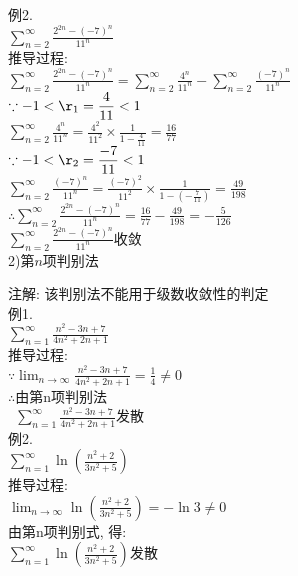 例2.\\
\phantom{例}$\displaystyle\sum_{n=2}^\infty\frac{2^{2n}-(-7)^n}{11^n}$\\
推导过程:\\
$\displaystyle\sum_{n=2}^\infty\frac{2^{2n}-(-7)^n}{11^n}=\sum_{n=2}^\infty\frac{4^n}{11^n}-\sum_{n=2}^\infty\frac{(-7)^n}{11^n}$\\
$\displaystyle\because -1<\r_1=\frac{4}{11}<1$\\
$\displaystyle\sum_{n=2}^\infty\frac{4^n}{11^n}=\frac{4^2}{11^2}\times\frac{1}{1-\frac{4}{11}}=\frac{16}{77}$\\
$\displaystyle\because -1<\r_2=\frac{-7}{11}<1$\\
$\displaystyle\sum_{n=2}^\infty\frac{(-7)^n}{11^n}=\frac{(-7)^2}{11^2}\times\frac{1}{1-(-\frac{7}{11})}=\frac{49}{198}$\\
$\displaystyle\therefore\sum_{n=2}^\infty\frac{2^{2n}-(-7)^n}{11^n}=\frac{16}{77}-\frac{49}{198}=-\frac{5}{126}$\\
$\displaystyle\sum_{n=2}^\infty\frac{2^{2n}-(-7)^n}{11^n}$收敛\\[2ex]

2)第$n$项判别法
\begin{center}
\end{center}
注解: 该判别法不能用于级数收敛性的判定\\
例1.\\
\phantom{例}$\displaystyle\sum_{n=1}^{\infty}\frac{n^2-3n+7}{4n^2+2n+1}$\\[1ex]
推导过程:\\
$\displaystyle\because\lim_{n\to\infty}\frac{n^2-3n+7}{4n^2+2n+1}=\frac{1}{4}\neq 0$\\
$\therefore$由第n项判别法\\
$\displaystyle\phantom{\therefore}\sum_{n=1}^\infty\frac{n^2-3n+7}{4n^2+2n+1}$发散\\[1ex]

例2.\\
\phantom{例}$\displaystyle\sum_{n=1}^\infty\ln(\frac{n^2+2}{3n^2+5})$\\
推导过程:\\
$\displaystyle\lim_{n\to\infty}\ln(\frac{n^2+2}{3n^2+5})=-\ln3\neq0$\\
由第n项判别式, 得:\\
$\displaystyle\sum_{n=1}^\infty\ln(\frac{n^2+2}{3n^2+5})$发散\\[2ex]

